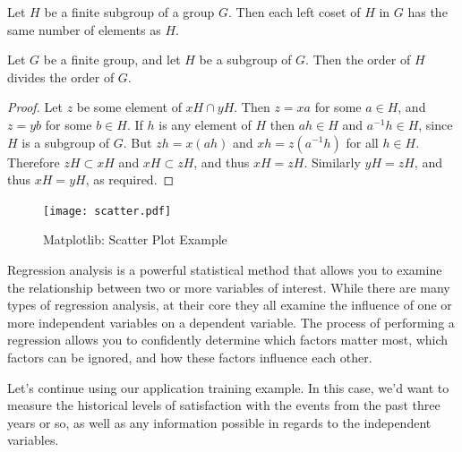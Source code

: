 \documentclass[en,hazy,device=normal,blue,14pt]{elegantnote}
\begin{document}
\begin{lemma}
Let $H$ be a finite subgroup of a group $G$.  Then each left
coset of $H$ in $G$ has the same number of elements as $H$.
\end{lemma}

\begin{theorem}
Let $G$ be a finite group, and let $H$ be a subgroup
of $G$.  Then the order of $H$ divides the order of $G$.
\end{theorem}

\begin{proof}
Let $z$ be some element of $xH \cap yH$.  Then $z = xa$ for some $a \in H$, and $z = yb$ for some $b \in H$. If $h$ is any element of $H$ then $ah \in H$ and $a^{-1}h \in H$, since $H$ is a subgroup of $G$. But $zh = x(ah)$ and $xh = z(a^{-1}h)$ for all $h \in H$. Therefore $zH \subset xH$ and $xH \subset zH$, and thus $xH = zH$.  Similarly $yH = zH$, and thus $xH = yH$, as required.
\end{proof}

\begin{figure}[!htbp]
	\centering
	\texttt{[image: scatter.pdf]}
	\caption{Matplotlib: Scatter Plot Example\label{fig:mpg}}
\end{figure}

Regression analysis is a powerful statistical method that allows you to examine the relationship between two or more variables of interest. While there are many types of regression analysis, at their core they all examine the influence of one or more independent variables on a dependent variable. The process of performing a regression allows you to confidently determine which factors matter most, which factors can be ignored, and how these factors influence each other.

Let's continue using our application training example. In this case, we'd want to measure the historical levels of satisfaction with the events from the past three years or so, as well as any information possible in regards to the independent variables. 
\end{document}
